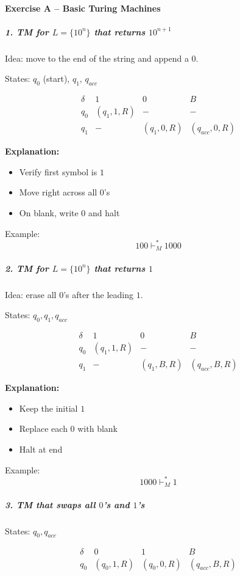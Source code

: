 \documentclass[11pt, a4paper]{article}
\theoremstyle{definition}
\theoremstyle{remark}
\begin{document}
\paragraph{Exercise A -- Basic Turing Machines}

\subparagraph{1. TM for $L=\{10^n\}$ that returns $10^{n+1}$}

Idea: move to the end of the string and append a $0$.

States: $q_0$ (start), $q_1$, $q_{acc}$

\[
\begin{array}{c|c|c|c}
\delta & 1 & 0 & B \\
\hline
q_0 & (q_1,1,R) & - & - \\
q_1 & - & (q_1,0,R) & (q_{acc},0,R)
\end{array}
\]

\textbf{Explanation:}
\begin{itemize}
    \item Verify first symbol is $1$
    \item Move right across all $0$'s
    \item On blank, write $0$ and halt
\end{itemize}

Example:
\[
100 \vdash_M^* 1000
\]


\subparagraph{2. TM for $L=\{10^n\}$ that returns $1$}

Idea: erase all $0$'s after the leading $1$.

States: $q_0, q_1, q_{acc}$

\[
\begin{array}{c|c|c|c}
\delta & 1 & 0 & B \\
\hline
q_0 & (q_1,1,R) & - & - \\
q_1 & - & (q_1,B,R) & (q_{acc},B,R)
\end{array}
\]

\textbf{Explanation:}
\begin{itemize}
    \item Keep the initial $1$
    \item Replace each $0$ with blank
    \item Halt at end
\end{itemize}

Example:
\[
1000 \vdash_M^* 1
\]


\subparagraph{3. TM that swaps all $0$'s and $1$'s}

States: $q_0, q_{acc}$

\[
\begin{array}{c|c|c|c}
\delta & 0 & 1 & B \\
\hline
q_0 & (q_0,1,R) & (q_0,0,R) & (q_{acc},B,R)
\end{array}
\]
\end{document}
